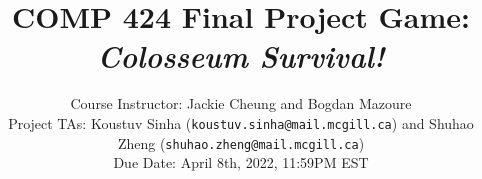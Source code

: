 \documentclass[twoside,11pt]{article}
\begin{document}
\title{COMP 424 Final Project Game: \textit{Colosseum Survival!}}
\author{Course Instructor: Jackie Cheung and Bogdan Mazoure \\ Project TAs: Koustuv Sinha (\texttt{koustuv.sinha@mail.mcgill.ca}) and Shuhao Zheng (\texttt{shuhao.zheng@mail.mcgill.ca}) \\ Due Date: April 8th, 2022, 11:59PM EST}



\maketitle




\end{document}
